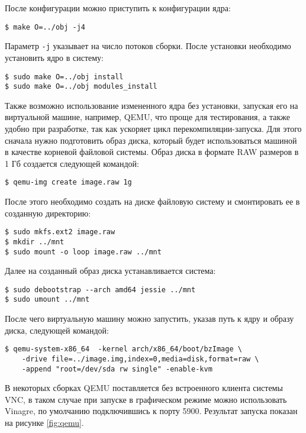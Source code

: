После конфигурации можно приступить к конфигурации ядра:
\medskip
\begin{lstlisting}[style=cstyle]
$ make O=../obj -j4
\end{lstlisting}
\medskip

Параметр \texttt{-j} указывает на число потоков сборки.
После установки необходимо установить ядро в систему:
\medskip
\begin{lstlisting}[style=cstyle]
$ sudo make O=../obj install
$ sudo make O=../obj modules_install
\end{lstlisting}
\medskip

Также возможно использование измененного ядра без установки, запуская его на
виртуальной машине, например, QEMU, что проще для тестирования, а также удобно
при разработке, так как ускоряет цикл перекомпиляции-запуска. Для этого сначала
нужно подготовить образ диска, который будет использоваться машиной в качестве
корневой файловой системы. Образ диска в формате RAW размеров в 1 Гб создается
следующей командой:
\medskip
\begin{lstlisting}[style=cstyle]
$ qemu-img create image.raw 1g
\end{lstlisting}
\medskip

После этого необходимо создать на диске файловую систему и смонтировать ее в
созданную директорию:
\medskip
\begin{lstlisting}[style=cstyle]
$ sudo mkfs.ext2 image.raw
$ mkdir ../mnt
$ sudo mount -o loop image.raw ../mnt
\end{lstlisting}
\medskip

Далее на созданный образ диска устанавливается система:
\medskip
\begin{lstlisting}[style=cstyle]
$ sudo debootstrap --arch amd64 jessie ../mnt
$ sudo umount ../mnt
\end{lstlisting}
\medskip

После чего виртуальную машину можно запустить, указав путь к ядру и образу диска,
следующей командой:
\medskip
\begin{lstlisting}[style=cstyle]
$ qemu-system-x86_64  -kernel arch/x86_64/boot/bzImage \
    -drive file=../image.img,index=0,media=disk,format=raw \
    -append "root=/dev/sda rw single" -enable-kvm
\end{lstlisting}
\medskip

В некоторых сборках QEMU поставляется без встроенного клиента системы VNC, в
таком случае при запуске в графическом режиме можно использовать Vinagre, по
умолчанию подключившись к порту 5900. Результат запуска показан на рисунке
\ref{fig:qemu}.

